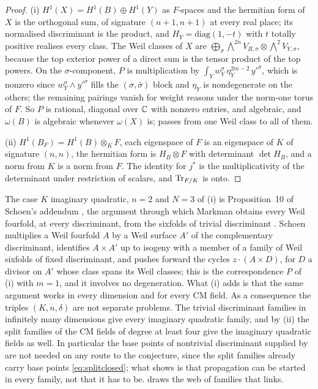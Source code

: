 \begin{proof}
(i) $H^{1}(X)=H^{1}(B)\oplus H^{1}(Y)$ as $F$-spaces and the hermitian form
of $X$ is the orthogonal sum, of signature $(n+1,n+1)$ at every real place;
its normalised discriminant is the product, and $H_{Y}=\mathrm{diag}(1,-t)$
with $t$ totally positive realises every class. The Weil classes of $X$ are
$\bigoplus_{\sigma}\bigwedge^{2n}V_{B,\sigma}\otimes\bigwedge^{2}V_{Y,\sigma}$,
because the top exterior power of a direct sum is the tensor product of the
top powers. On the $\sigma$-component, $P$ is multiplication by
$\int_{Y}w_{Y}^{\sigma}\,\eta_{Y}^{2m-2}\,y'^{\bar\sigma}$, which is nonzero
since $w_{Y}^{\sigma}\wedge y'^{\bar\sigma}$ fills the $(\sigma,\bar\sigma)$
block and $\eta_{Y}$ is nondegenerate on the others; the remaining pairings
vanish for weight reasons under the norm-one torus of $F$. So $P$ is
rational, diagonal over $\mathbb{C}$ with nonzero entries, and algebraic, and
$\omega(B)$ is algebraic whenever $\omega(X)$ is; 
passes from one Weil class to all of them.

(ii) $H^{1}(B_{F})=H^{1}(B)\otimes_{K}F$, each eigenspace of $F$ is an
eigenspace of $K$ of signature $(n,n)$, the hermitian form is $H_{B}\otimes F$ with determinant $\det H_{B}$, and a norm
from $K$ is a norm from $F$. The identity for $j^{*}$ is the multiplicativity
of the determinant under restriction of scalars, and $\operatorname{Tr}_{F/K}$ is onto.
\end{proof}

The case $K$ imaginary quadratic, $n=2$ and $N=3$ of (i) is Proposition~10
of Schoen's addendum \cite{Sch98}, the argument through which Markman obtains
every Weil fourfold, at every discriminant, from the sixfolds of trivial
discriminant \cite{Mar25a}. Schoen multiplies a Weil fourfold $A$ by a Weil
surface $A'$ of the complementary discriminant, identifies $A\times A'$ up to
isogeny with a member of a family of Weil sixfolds of fixed discriminant, and
pushes forward the cycles $z\cdot(A\times D)$, for $D$ a divisor on $A'$
whose class spans its Weil classes; this is the correspondence $P$ of (i)
with $m=1$, and it involves no degeneration. What (i) adds is that the same
argument works in every dimension and for every CM field. As a consequence
the triples $(K,n,\delta)$ are not separate problems. The trivial
discriminant families in infinitely many dimensions give every imaginary
quadratic family, and by (ii) the split families of the CM fields of degree
at least four give the imaginary quadratic fields as well. In particular the
base points of nontrivial discriminant supplied by  are
not needed on any route to the conjecture, since the split families already
carry base points \eqref{eq:splitclosed}; what  shows
is that propagation can be started in every family, not that it has to be.
 draws the web of families that  links.

